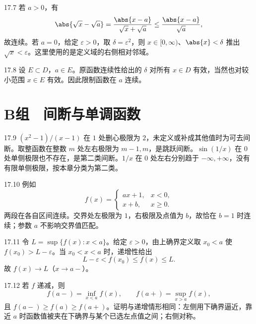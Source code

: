 \begin{solution}{17.7}
若 \(a>0\)，有
\[
 \abs{\sqrt x-\sqrt a}
 =\frac{\abs{x-a}}{\sqrt x+\sqrt a}
 \le\frac{\abs{x-a}}{\sqrt a},
\]
故连续。若 \(a=0\)，给定 \(\varepsilon>0\)，取 \(\delta=\varepsilon^2\)，则 \(x\in[0,\infty)\)、\(\abs{x}<\delta\) 推出 \(\sqrt x<\varepsilon\)。这里使用的是定义域的右侧相对邻域。
\end{solution}

\begin{solution}{17.8}
设 \(E\subset D\)，\(a\in E\)。原函数连续性给出的 \(\delta\) 对所有 \(x\in D\) 有效，当然也对较小范围 \(x\in E\) 有效。因此限制函数在 \(a\) 连续。
\end{solution}

\section*{B组　间断与单调函数}

\begin{solution}{17.9}
\((x^2-1)/(x-1)\) 在 \(1\) 处删心极限为 \(2\)，未定义或补成其他值时为可去间断。取整函数在整数 \(m\) 处左右极限为 \(m-1,m\)，是跳跃间断。\(\sin(1/x)\) 在 \(0\) 处单侧极限也不存在，是第二类间断。\(1/x\) 在 \(0\) 处左右分别趋于 \(-\infty,+\infty\)，没有有限单侧极限，按本章分类为第二类。
\end{solution}

\begin{solution}{17.10}
例如
\[
 f(x)=
 \begin{cases}
 ax+1,&x<0,\\
 x+b,&x\ge0.
 \end{cases}
\]
两段在各自区间连续。交界处左极限为 \(1\)，右极限及点值为 \(b\)，故恰在 \(b=1\) 时连续；参数 \(a\) 不影响交界值匹配。
\end{solution}

\begin{solution}{17.11}
令 \(L=\sup\{f(x):x<a\}\)。给定 \(\varepsilon>0\)，由上确界定义取 \(x_0<a\) 使 \(f(x_0)>L-\varepsilon\)。当 \(x_0<x<a\) 时，递增性给出
\[
 L-\varepsilon<f(x_0)\le f(x)\le L.
\]
故 \(f(x)\to L\)（\(x\to a-\)）。
\end{solution}

\begin{solution}{17.12}
若 \(f\) 递减，则
\[
 f(a-)=\inf_{x<a}f(x),\qquad
 f(a+)=\sup_{x>a}f(x),
\]
且 \(f(a-)\ge f(a)\ge f(a+)\)。证明与递增情形相同：左侧用下确界逼近，靠近 \(a\) 时函数值被夹在下确界与某个已选左点值之间；右侧对称。
\end{solution}


